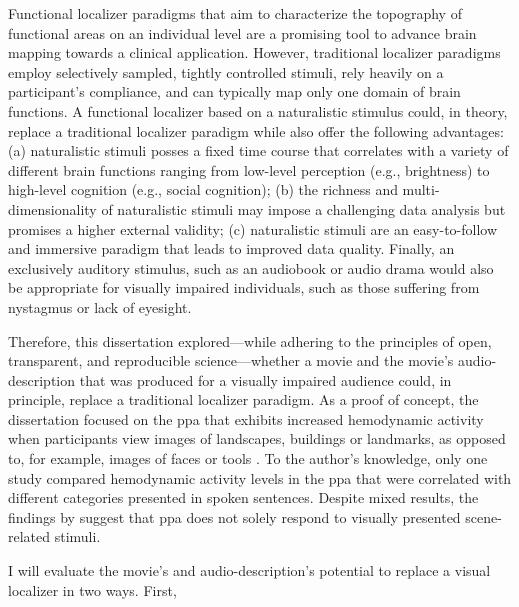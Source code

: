 Functional localizer paradigms that aim to characterize the topography of
functional areas on an individual level are a promising tool to advance brain
mapping towards a clinical application.
However, traditional localizer paradigms employ selectively sampled, tightly
controlled stimuli, rely heavily on a participant's compliance, and can
typically map only one domain of brain functions.
A functional localizer based on a naturalistic stimulus could, in theory,
replace a traditional localizer paradigm while also offer the following
advantages:
(a) naturalistic stimuli posses a fixed time course that correlates with a
variety of different brain functions ranging from low-level perception (e.g.,
brightness) to high-level cognition (e.g., social cognition);
(b) the richness and multi-dimensionality of naturalistic stimuli may impose a
challenging data analysis but promises a higher external validity;
(c) naturalistic stimuli are an easy-to-follow and immersive paradigm that leads
to improved data quality.
Finally, an exclusively auditory stimulus, such as an audiobook or audio drama
would also be appropriate for visually impaired individuals, such as those
suffering from nystagmus or lack of eyesight.

Therefore, this dissertation explored---while adhering to the principles of
open, transparent, and reproducible science---whether a movie and the movie's
audio-description that was produced for a visually impaired audience could, in
principle, replace a traditional localizer paradigm.
As a proof of concept, the dissertation focused on the \ac{ppa} that exhibits
increased hemodynamic activity when participants view images of landscapes,
buildings or landmarks, as opposed to, for example, images of faces or tools
\citep[s.][for reviews]{epstein2014neural, aminoff2013role}.
To the author's knowledge, only one study \citep[cf.][]{aziz2008modulation}
compared hemodynamic activity levels in the \ac{ppa} that were correlated with
different categories presented in spoken sentences.
%
Despite mixed results, the findings by \citet{aziz2008modulation} suggest that
\ac{ppa} does not solely respond to visually presented scene-related stimuli.



I will evaluate the movie's and audio-description's potential to replace a
visual localizer in two ways.
First,




